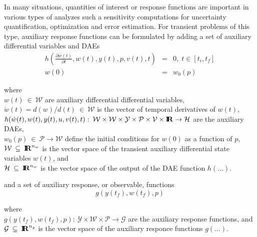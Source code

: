 \documentclass[pdf,ps2pdf,11pt]{SANDreport}
\begin{document}
In many situations, quantities of interest or response functions are important
in various types of analyzes such a sensitivity computations for uncertainty
quantification, optimization and error estimation.  For transient problems of
this type, auxiliary response functions can be formulated by adding a set of
auxiliary differential variables and DAEs
%
\begin{eqnarray}
h\left( \frac{\partial w(t)}{\partial t}, w(t), y(t), p, v(t), t \right) & = & 0,
\; t \in \left[ t_i, t_f \right] \label{rythmos:eqn:app:h} \\
w(0) & = & w_0(p) \label{rythmos:eqn:app:h:ic}
\end{eqnarray}
\begin{tabbing}
\hspace{4ex}where\hspace{1ex}\= \\
\>	$w(t) \:\in\:\mathcal{W}$ are auxiliary differential differential variables, \\
\>	$\dot{w}(t) = d(w)/d(t)\:\in\:\mathcal{W}$ is the vector of temporal derivatives of $w(t)$, \\
\>	$h(\dot{w}(t), w(t), y(t), u, v(t), t) : \:
 		\mathcal{W} \times \mathcal{W} \times \mathcal{Y} \times \mathcal{P} \times \mathcal{V} \times \mbox{\textbf{I}}\hspace{-0.6ex}\mbox{\textbf{R}}
		\rightarrow \mathcal{H}$ are the auxiliary DAEs, \\
\>	$w_0(p) \:\in\:\mathcal{P} \rightarrow \mathcal{W}$ define the initial conditions for $w(0)$ as a function of $p$, \\
\>	$\mathcal{W} \:\subseteq\:\mbox{\textbf{I}}\hspace{-0.6ex}\mbox{\textbf{R}}^{n_w}$ is the vector space of the transient auxiliary differential state variables $w(t)$, and \\
\>	$\mathcal{H} \:\subseteq\:\mbox{\textbf{I}}\hspace{-0.6ex}\mbox{\textbf{R}}^{n_w}$ is the vector space of the output of the DAE function $h(\ldots)$.
\end{tabbing}
%
and a set of auxiliary response, or observable, functions
%
\begin{equation}
g(y(t_f),w(t_f),p)
\label{rythmos:eqn:app:g}
\end{equation}
\begin{tabbing}
\hspace{4ex}where\hspace{1ex}\= \\
\>	$g(y(t_f),w(t_f),p) : \:
		\mathcal{Y} \times \mathcal{W} \times \mathcal{P}
		\rightarrow \mathcal{G}$ are the auxiliary response functions, and \\ 
\>	$\mathcal{G} \:\subseteq\:\mbox{\textbf{I}}\hspace{-0.6ex}\mbox{\textbf{R}}^{n_g}$ is the vector space of the auxiliary responce functions $g(\ldots)$.
\end{tabbing}
\end{document}
